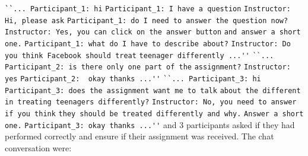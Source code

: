 \begin{itemize}
\verb|``... Participant_1: hi|\hfill
	\newline \verb|Participant_1: I have a question|\hfill 
       	\newline \verb|Instructor: Hi, please ask|\hfill
       \newline \verb|Participant_1: do I need to answer the question now?|\hfill
       \newline \verb|Instructor: Yes, you can click on the answer button|\hfill
       \newline \verb|and answer a short one.|\hfill
       \newline \verb|Participant_1: what do I have to describe about?|\hfill  
       \newline \verb|Instructor: Do you think Facebook should treat|\hfill 
       \newline \verb|teenager differently ...''|\hfill
\newline\newline \verb|``... Participant_2: is there only one part of the|\hfill
\newline\verb|assignment?|\hfill
      \newline\verb|Instructor:	yes|\hfill 
      \newline\verb|Participant_2: 	okay thanks ...''|\hfill 
\newline\newline \verb|``... Participant_3: hi|\hfill 
      \newline\verb|Participant_3: does the assignment want me to talk|\hfill
      \newline\verb|about the different in treating teenagers differently?|\hfill
       \newline \verb|Instructor: No, you need to answer if you think|\hfill
       \newline \verb|they should be treated differently and why.|\hfill
       \newline\verb|Answer a short one.|\hfill
       \newline\verb|Participant_3: okay thanks ...''|
\newline 
\newline \noindent and 3 participants asked if they had performed correctly and ensure if their assignment was received. The chat conversation were: 


\end{itemize}
